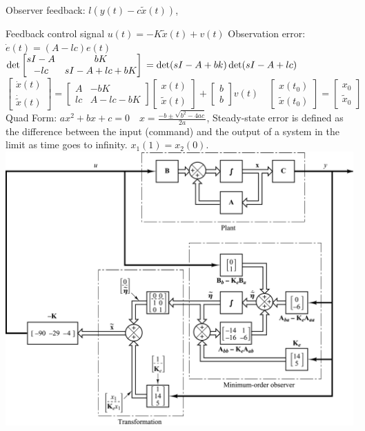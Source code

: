 \begin{multicols*}{3}
Observer feedback: $l(y(t)-c\tilde{x}(t))$,

Feedback control signal $u(t)=-K\tilde{x}(t)+v(t)$ \hfill \break 
Observation error: $\dot{e}(t)=(A-lc)e(t)$
$\det \begin{bmatrix}sI-A & bK \\
-lc & sI-A+lc+bK
\end{bmatrix} \\ =\det(sI-A+bk)\det(sI-A+lc)$
$\begin{bmatrix}
\dot{x}(t) \\
\dot{\tilde{x}}(t)
\end{bmatrix}= \begin{bmatrix}
A  & -bK \\
lc & A-lc-bK
\end{bmatrix}\begin{bmatrix}
x(t) \\
{\tilde{x}}(t)
\end{bmatrix}+
\begin{bmatrix}
b \\ b
\end{bmatrix} v(t) \quad 
\begin{bmatrix}
x(t_0) \\ \tilde{x}(t_0)
\end{bmatrix}=
\begin{bmatrix}
x_0 \\ \tilde{x}_0
\end{bmatrix}
$
\vspace{0.1 cm}
Quad Form: $ax^2+bx+c=0 \quad x= \frac{-b \pm \sqrt{b^2-4ac}}{2a}$,
Steady-state error is defined as the difference between the input (command) and the output of a system in the limit as time goes to infinity. $x_1(1)=x_2(0)$.
\includegraphics[width=\linewidth]{fullEstimateobs.png}

\end{multicols*}
